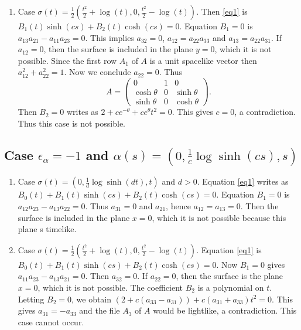 \documentclass[a4paper,12pt]{amsart}
\numberwithin{equation}{section}
\theoremstyle{definition}
\begin{document}
\begin{enumerate}
  \item Case  $\sigma(t)=\frac{1}{2}\left(\frac{t^2}{2}+\log(t),0, \frac{t^2}{2}-\log(t)\right)$. Then \eqref{eq1} is    $B_1(t)\sinh(cs)+B_2(t)\cosh(cs)=0$. Equation $B_1=0$ is $a_{13} a_{21}-a_{11} a_{23}=0$. 
This implies $a_{32}=0$, $a_{12}=a_{22}a_{33}$ and $a_{13}=a_{22}a_{31}$. If $a_{12}=0$, then the surface is included in the plane $y=0$, which it is not possible.  Since the first row $A_1$ of $A$ is a unit spacelike vector then $a_{12}^2+a_{22}^2=1$.  Now we conclude $a_{22}=0$. Thus 
$$A=\begin{pmatrix}0&1&0\\ \cosh\theta&0&\sinh\theta\\ \sinh\theta&0&\cosh\theta\end{pmatrix}.$$
Then $B_2=0$ writes as $2+c e^{-\theta}+ce^{\theta}t^2=0$. This gives $c=0$, a contradiction. Thus this case is not possible.

 
\end{enumerate}



\subsection{Case $\epsilon_\alpha=-1$ and $\alpha(s)=(0,\frac{1}{c}\log\sinh(c s),s)$}
\begin{enumerate}

\item Case   $\sigma(t)=(0, \frac{1}{d}\log\sinh(dt),t)$ and $d>0$.  Equation \eqref{eq1} writes as $B_0(t)+B_1(t)\sinh(cs)+B_2(t)\cosh(cs)=0$. Equation $B_1=0$ is $a_{12} a_{23}-a_{13} a_{22}=0$. Thus $a_{31}=0$ and $a_{21}$, hence $a_{12}=a_{13}=0$. Then  the surface is included in the plane $x=0$, which it is not possible because this plane s timelike.

  \item Case  $\sigma(t)=\frac{1}{2}\left(\frac{t^2}{2}+\log(t),0, \frac{t^2}{2}-\log(t)\right)$.  Equation \eqref{eq1} is $B_0(t)+B_1(t)\sinh(cs)+B_2(t)\cosh(cs)=0$. Now $B_1=0$ gives $a_{11}a_{23}-a_{13}a_{21}=0$. Then $a_{32}=0$. If $a_{22}=0$, then the surface is the plane $x=0$, which it is not possible. The coefficient $B_2$ is a polynomial on $t$. Letting $B_2=0$, we obtain
   $(2+c(a_{33}-a_{31}))+c(a_{31}+a_{33})t^2=0$. This gives $a_{31}=-a_{33}$ and the file $A_3$ of $A$ would be lightlike, a contradiction. This case cannot occur.

\end{enumerate}
\end{document}
